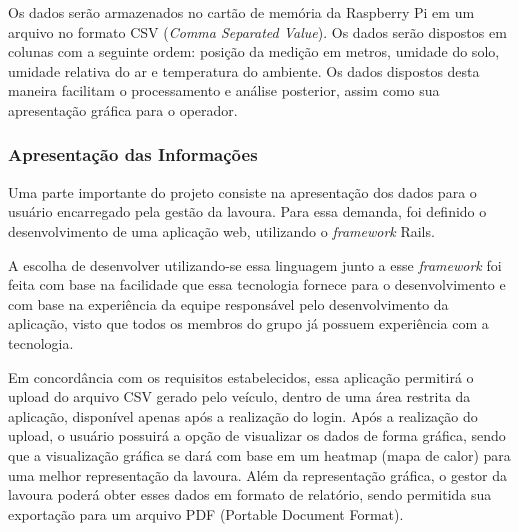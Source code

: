   Os dados serão armazenados no cartão de memória da Raspberry Pi
  em um arquivo no formato CSV (\textit{Comma Separated Value}). Os dados
  serão dispostos em colunas com a seguinte ordem: posição da medição
  em metros, umidade do solo, umidade relativa do ar e temperatura do
  ambiente.
  Os dados dispostos desta maneira facilitam o processamento e
  análise posterior, assim como sua apresentação gráfica para
  o operador.

  \subsubsection{Apresentação das Informações}

  Uma parte importante do projeto consiste na apresentação dos
  dados para o usuário encarregado pela gestão da lavoura. Para essa demanda,
  foi definido o desenvolvimento de uma aplicação web, utilizando
  o \textit{framework} Rails.

  A escolha de desenvolver utilizando-se essa linguagem junto a
  esse \textit{framework} foi feita com base na facilidade que essa
  tecnologia fornece para o desenvolvimento e com base na experiência
  da equipe responsável pelo desenvolvimento da aplicação, visto que
  todos os membros do grupo já possuem experiência com a tecnologia.

  Em concordância com os requisitos estabelecidos, essa aplicação
  permitirá o upload do arquivo CSV gerado pelo veículo, dentro de
  uma área restrita da aplicação, disponível apenas após a realização
  do login.
  Após a realização do upload, o usuário possuirá a opção de visualizar
  os dados de forma gráfica, sendo que a visualização gráfica se dará
  com base em um heatmap (mapa de calor) para uma melhor representação
  da lavoura.
  Além da representação gráfica, o gestor da lavoura poderá obter
  esses dados em formato de relatório, sendo permitida sua
  exportação para um arquivo PDF (Portable Document Format).
